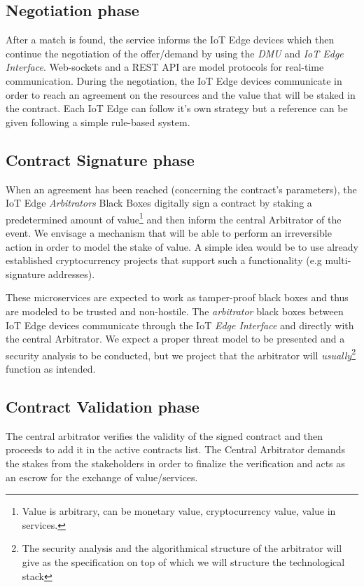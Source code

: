 \subsection{Negotiation phase}
After a match is found, the service informs the IoT Edge devices which then continue the negotiation of the offer/demand by using the \textit{DMU} and \textit{IoT Edge Interface}. Web-sockets and a REST API are model protocols for real-time communication. During the negotiation, the IoT Edge devices communicate in order to reach an agreement on the resources and the value that will be staked in the contract. Each IoT Edge can follow it’s own strategy but a reference can be given following a simple rule-based system.

\subsection{Contract Signature phase}
When an agreement has been reached (concerning the contract’s parameters), the IoT Edge \textit{Arbitrators} Black Boxes digitally sign a contract by staking a predetermined amount of value\footnote{Value is arbitrary, can be monetary value, cryptocurrency value, value in services.} and then inform the central Arbitrator of the event. We envisage a mechanism that will be able to perform an irreversible action in order to model the stake of value. A simple idea would be to use already established cryptocurrency projects that support such a functionality (e.g multi-signature addresses).

These microservices are expected to work as tamper-proof black boxes and thus are modeled to be trusted and non-hostile. The \textit{arbitrator} black boxes between IoT Edge devices communicate through the IoT \textit{Edge Interface} and directly with the central Arbitrator. We expect a proper threat model to be presented and a security analysis to be conducted, but we project that the arbitrator will \textit{usually}\footnote{The security analysis and the algorithmical structure of the arbitrator will give as the specification on top of which we will structure the technological stack} function as intended.


\subsection{Contract Validation phase}
The central arbitrator verifies the validity of the signed contract and then proceeds to add it in the active contracts list. The Central Arbitrator demands the stakes from the stakeholders in order to finalize the verification and acts as an escrow for the exchange of value/services.

